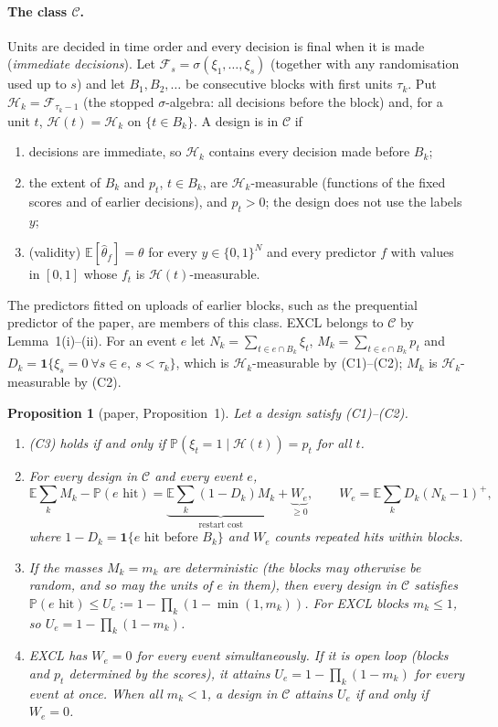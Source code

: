 \documentclass[11pt]{article}
\newtheorem{proposition}{Proposition}
\theoremstyle{remark}
\newcommand{\E}{\mathbb{E}}
\renewcommand{\Pr}{\mathbb{P}}
\newcommand{\one}{\mathbf 1}
\newcommand{\Hk}{\mathcal H}
\newcommand{\hth}{\hat\theta}
\begin{document}
\paragraph{The class $\mathcal C$.}
Units are decided in time order and every decision is final when it is made (\emph{immediate decisions}). Let $\mathcal F_s=\sigma(\xi_1,\dots,\xi_s)$ (together with any randomisation used up to $s$) and let $B_1,B_2,\dots$ be consecutive blocks with first units $\tau_k$. Put $\Hk_k=\mathcal F_{\tau_k-1}$ (the stopped $\sigma$-algebra: all decisions before the block) and, for a unit $t$, $\Hk(t)=\Hk_k$ on $\{t\in B_k\}$. A design is in $\mathcal C$ if

\begin{enumerate}[label=(C\arabic*)]
\item decisions are immediate, so $\Hk_k$ contains every decision made before $B_k$;
\item the extent of $B_k$ and $p_t$, $t\in B_k$, are $\Hk_k$-measurable (functions of the fixed scores and of earlier decisions), and $p_t>0$; the design does not use the labels $y$;
\item (validity) $\E[\hth_f]=\theta$ for every $y\in\{0,1\}^N$ and every predictor $f$ with values in $[0,1]$ whose $f_t$ is $\Hk(t)$-measurable.
\end{enumerate}

\noindent The predictors fitted on uploads of earlier blocks, such as the prequential predictor of the paper, are members of this class. EXCL belongs to $\mathcal C$ by Lemma~1(i)--(ii). For an event $e$ let $N_k=\sum_{t\in e\cap B_k}\xi_t$, $M_k=\sum_{t\in e\cap B_k}p_t$ and $D_k=\one\{\xi_s=0\ \forall s\in e,\ s<\tau_k\}$, which is $\Hk_k$-measurable by (C1)--(C2); $M_k$ is $\Hk_k$-measurable by (C2).

\begin{proposition}[paper, Proposition~1]\label{prop:opt}
Let a design satisfy (C1)--(C2).
\begin{enumerate}[label=(\alph*)]
\item (C3) holds if and only if $\Pr(\xi_t=1\mid\Hk(t))=p_t$ for all $t$.
\item For every design in $\mathcal C$ and every event $e$,
\[
\E\sum_kM_k-\Pr(e\text{ hit})=\underbrace{\E\sum_k(1-D_k)M_k}_{\text{restart cost}}+\underbrace{W_e}_{\ge0},\qquad W_e=\E\sum_kD_k(N_k-1)^+ ,
\]
where $1-D_k=\one\{e\text{ hit before }B_k\}$ and $W_e$ counts repeated hits within blocks.
\item If the masses $M_k=m_k$ are deterministic (the blocks may otherwise be random, and so may the units of $e$ in them), then every design in $\mathcal C$ satisfies $\Pr(e\text{ hit})\le U_e:=1-\prod_k(1-\min(1,m_k))$. For EXCL blocks $m_k\le1$, so $U_e=1-\prod_k(1-m_k)$.
\item EXCL has $W_e=0$ for every event simultaneously. If it is open loop (blocks and $p_t$ determined by the scores), it attains $U_e=1-\prod_k(1-m_k)$ for every event at once. When all $m_k<1$, a design in $\mathcal C$ attains $U_e$ if and only if $W_e=0$.
\end{enumerate}
\end{proposition}
\end{document}
